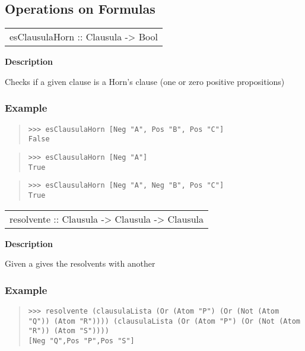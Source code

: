 \subsection{Operations on Formulas}
\begin{haddockdesc}
\item[\begin{tabular}{@{}l}
esClausulaHorn :: Clausula -> Bool
\end{tabular}]
{\haddockbegindoc
\textbf{Description}\par
Checks if a given clause is a Horn's clause (one or zero positive propositions)\par
\subsubsection*{\textbf{Example}}
\begin{quote}
{\haddockverb\begin{verbatim}
>>> esClausulaHorn [Neg "A", Pos "B", Pos "C"]
False

\end{verbatim}}
\end{quote}
\begin{quote}
{\haddockverb\begin{verbatim}
>>> esClausulaHorn [Neg "A"]
True

\end{verbatim}}
\end{quote}
\begin{quote}
{\haddockverb\begin{verbatim}
>>> esClausulaHorn [Neg "A", Neg "B", Pos "C"]
True

\end{verbatim}}
\end{quote}}
\end{haddockdesc}
\begin{haddockdesc}
\item[\begin{tabular}{@{}l}
resolvente :: Clausula -> Clausula -> Clausula
\end{tabular}]
{\haddockbegindoc
\textbf{Description}\par
Given a  gives the resolvents with another \par
\subsubsection*{\textbf{Example}}
\begin{quote}
{\haddockverb\begin{verbatim}
>>> resolvente (clausulaLista (Or (Atom "P") (Or (Not (Atom "Q")) (Atom "R")))) (clausulaLista (Or (Atom "P") (Or (Not (Atom "R")) (Atom "S"))))
[Neg "Q",Pos "P",Pos "S"]

\end{verbatim}}
\end{quote}}
\end{haddockdesc}
